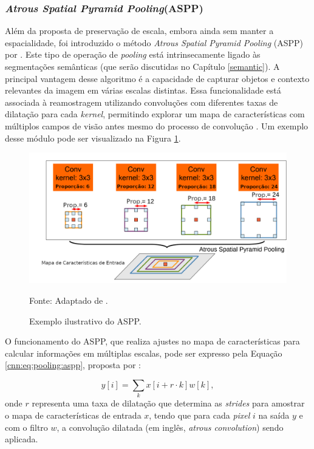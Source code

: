 \subsubsection{\textit{Atrous Spatial Pyramid Pooling}(ASPP)}
\label{cnn:pooling:aspp}
Além da proposta de preservação de escala, embora ainda sem manter a espacialidade, foi introduzido o método \textit{Atrous Spatial Pyramid Pooling} (ASPP) por \cite{Chen2018}. Este tipo de operação de \textit{pooling} está intrinsecamente ligado às segmentações semânticas \citep{Mohan2020} (que serão discutidas no Capítulo \ref{semantic}). A principal vantagem desse algoritmo é a capacidade de capturar objetos e contexto relevantes da imagem em várias escalas distintas. Essa funcionalidade está associada à reamostragem utilizando convoluções com diferentes taxas de dilatação para cada \textit{kernel}, permitindo explorar um mapa de características com múltiplos campos de visão antes mesmo do processo de convolução \citep{Chen2018}. Um exemplo desse módulo pode ser visualizado na Figura \ref{cnn:fig:aspp}.

\begin{figure}[H]
    \centering
    \caption{Exemplo ilustrativo do ASPP.}
    \includegraphics[width=1\textwidth]{recursos/imagens/project/aspp.png}
    \label{cnn:fig:aspp}

    Fonte: Adaptado de \cite{Chen2018}.
\end{figure}

O funcionamento do ASPP, que realiza ajustes no mapa de características para calcular informações em múltiplas escalas, pode ser expresso pela Equação \ref{cnn:eq:pooling:aspp}, proposta por \cite{Chen2018}:

\begin{equation}
    \label{cnn:eq:pooling:aspp}
    y[i] = \sum_{k}x[i + r \cdot k]w [k],
\end{equation}
onde $r$ representa uma taxa de dilatação que determina as \textit{strides} para amostrar o mapa de características de entrada $x$, tendo que para cada \textit{pixel} $i$ na saída $y$ e com o filtro $w$, a convolução dilatada (em inglês, \textit{atrous convolution}) sendo aplicada.


